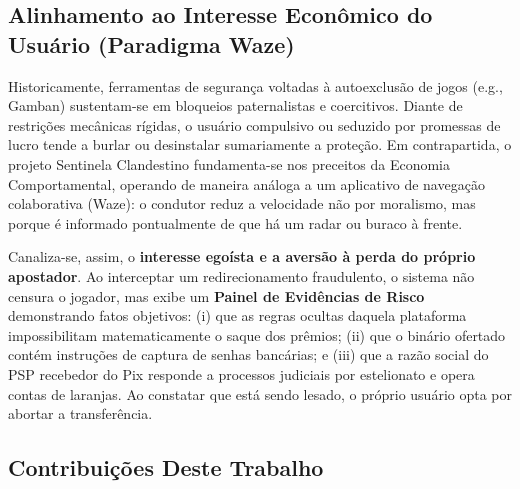 \subsection{Alinhamento ao Interesse Econ\^{o}mico do Usu\'{a}rio (Paradigma Waze)}

Historicamente, ferramentas de seguran\c{c}a voltadas \`{a} autoexclus\~{a}o de jogos (e.g., Gamban) sustentam-se em bloqueios paternalistas e coercitivos. Diante de restri\c{c}\~{o}es mec\^{a}nicas r\'{i}gidas, o usu\'{a}rio compulsivo ou seduzido por promessas de lucro tende a burlar ou desinstalar sumariamente a prote\c{c}\~{a}o. Em contrapartida, o projeto Sentinela Clandestino fundamenta-se nos preceitos da Economia Comportamental, operando de maneira an\'{a}loga a um aplicativo de navega\c{c}\~{a}o colaborativa (Waze): o condutor reduz a velocidade n\~{a}o por moralismo, mas porque \'{e} informado pontualmente de que h\'{a} um radar ou buraco \`{a} frente. 

Canaliza-se, assim, o \textbf{interesse ego\'{i}sta e a avers\~{a}o \`{a} perda do pr\'{o}prio apostador}. Ao interceptar um redirecionamento fraudulento, o sistema n\~{a}o censura o jogador, mas exibe um \textbf{Painel de Evid\^{e}ncias de Risco} demonstrando fatos objetivos: (i) que as regras ocultas daquela plataforma impossibilitam matematicamente o saque dos pr\^{e}mios; (ii) que o bin\'{a}rio ofertado cont\'{e}m instru\c{c}\~{o}es de captura de senhas banc\'{a}rias; e (iii) que a raz\~{a}o social do PSP recebedor do Pix responde a processos judiciais por estelionato e opera contas de laranjas. Ao constatar que est\'{a} sendo lesado, o pr\'{o}prio usu\'{a}rio opta por abortar a transfer\^{e}ncia.

\subsection{Contribui\c{c}\~{o}es Deste Trabalho}

